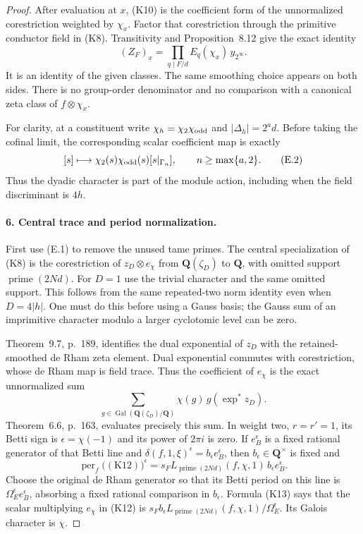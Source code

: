 \documentclass[11pt]{article}
\theoremstyle{definition}
\theoremstyle{remark}
\begin{document}
\begin{proof}
After evaluation at $x$, (K10) is the coefficient form of the
unnormalized corestriction weighted by $\chi_x$. Factor that
corestriction through the primitive conductor field in (K8).
Transitivity and Proposition~8.12 give the exact identity
\[
              (Z_F)_x=
       \prod_{q\mid F/d}E_q(\chi_x)\,y_{2^\infty}.        \tag{E.1}
\]
It is an identity of the given classes. The same smoothing choice
appears on both sides. There is no group-order denominator and no
comparison with a canonical zeta class of $f\otimes\chi_x$.

For clarity, at a constituent write $\chi_h=\chi_2\chi_{\rm odd}$ and
$|\Delta_h|=2^a d$. Before taking the cofinal limit, the corresponding
scalar coefficient map is exactly
\[
 [s]\longmapsto\chi_2(s)\chi_{\rm odd}(s)[s|_{\Gamma_n}],
                    \qquad n\ge\max\{a,2\}.\tag{E.2}
\]
Thus the dyadic character is part of the module action, including
when the field discriminant is $4h$.

\paragraph{6. Central trace and period normalization.}
First use (E.1) to remove the unused tame primes. The central
specialization of (K8) is the corestriction of $z_D\otimes e_\chi$
from $\mathbf Q(\zeta_D)$ to $\mathbf Q$, with omitted support
$\operatorname{prime}(2Nd)$. For $D=1$ use the trivial character
and the same omitted support. This follows from the same repeated-two
norm identity even when $D=4|h|$. One must do this before using a
Gauss basis; the Gauss sum of an imprimitive character modulo a
larger cyclotomic level can be zero.

Theorem~9.7, p.~189, identifies the dual exponential of $z_D$ with
the retained-smoothed de Rham zeta element. Dual exponential commutes
with corestriction, whose de Rham map is field trace. Thus the
coefficient of $e_\chi$ is the exact unnormalized sum
\[
                    \sum_{g\in\operatorname{Gal}(\mathbf Q(\zeta_D)/\mathbf Q)}
                       \chi(g)\,g(\exp^*z_D).             \tag{K12}
\]
Theorem~6.6, p.~163, evaluates precisely this sum. In weight two,
$r=r'=1$, its Betti sign is $\epsilon=\chi(-1)$ and its power of
$2\pi i$ is zero. If $e_B^\epsilon$ is a fixed rational generator
of that Betti line and
$\delta(f,1,\xi)^\epsilon=b_\epsilon e_B^\epsilon$, then
$b_\epsilon\in\mathbf Q^\times$ is fixed and
\[
     \operatorname{per}_f\bigl((\text{K12})\bigr)^\epsilon
          =s_F L_{\operatorname{prime}(2Nd)}(f,\chi,1)\,
                        b_\epsilon e_B^\epsilon.          \tag{K13}
\]
Choose the original de Rham generator so that its Betti period
on this line is $\Omega_E^\epsilon e_B^\epsilon$, absorbing a
fixed rational comparison in $b_\epsilon$. Formula (K13) says
that the scalar multiplying $e_\chi$ in (K12) is
$s_F b_\epsilon L_{\operatorname{prime}(2Nd)}(f,\chi,1)/
\Omega_E^\epsilon$. Its Galois character is $\chi$.


\end{proof}
\end{document}
